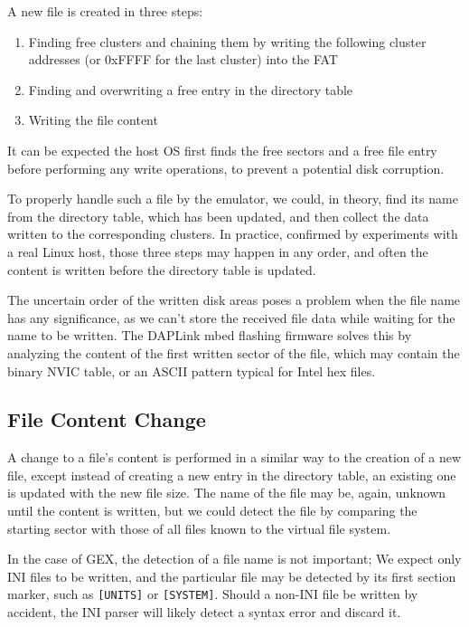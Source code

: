 A new file is created in three steps:

\begin{enumerate}
	\item Finding free clusters and chaining them by writing the following cluster addresses (or 0xFFFF for the last cluster) into the FAT
	\item Finding and overwriting a free entry in the directory table
	\item Writing the file content
\end{enumerate}

It can be expected the host OS first finds the free sectors and a free file entry before performing any write operations, to prevent a potential disk corruption.

To properly handle such a file by the emulator, we could, in theory, find its name from the directory table, which has been updated, and then collect the data written to the corresponding clusters. In practice, confirmed by experiments with a real Linux host, those three steps may happen in any order, and often the content is written before the directory table is updated. 

The uncertain order of the written disk areas poses a problem when the file name has any significance, as we can't store the received file data while waiting for the name to be written. The DAPLink mbed flashing firmware solves this by analyzing the content of the first written sector of the file, which may contain the binary NVIC table, or an ASCII pattern typical for Intel hex files.

\subsection{File Content Change}

A change to a file's content is performed in a similar way to the creation of a new file, except instead of creating a new entry in the directory table, an existing one is updated with the new file size. The name of the file may be, again, unknown until the content is written, but we could detect the file by comparing the starting sector with those of all files known to the virtual file system.

In the case of GEX, the detection of a file name is not important; We expect only INI files to be written, and the particular file may be detected by its first section marker, such as \verb|[UNITS]| or \verb|[SYSTEM]|. Should a non-INI file be written by accident, the INI parser will likely detect a syntax error and discard it.

